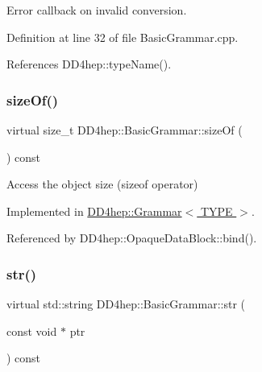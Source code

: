 Error callback on invalid conversion. 



Definition at line 32 of file Basic\+Grammar.\+cpp.



References D\+D4hep\+::type\+Name().

\hypertarget{class_d_d4hep_1_1_basic_grammar_a5e2ae03f6371357d3da7e082bbeabb0d}{}\label{class_d_d4hep_1_1_basic_grammar_a5e2ae03f6371357d3da7e082bbeabb0d} 
\subsubsection{\texorpdfstring{size\+Of()}{sizeOf()}}
{\footnotesize\ttfamily virtual size\+\_\+t D\+D4hep\+::\+Basic\+Grammar\+::size\+Of (\begin{DoxyParamCaption}{ }\end{DoxyParamCaption}) const\hspace{0.3cm}{\ttfamily [pure virtual]}}



Access the object size (sizeof operator) 



Implemented in \hyperlink{class_d_d4hep_1_1_grammar_a12daedd346b5eec5a95c0081918d7e0b}{D\+D4hep\+::\+Grammar$<$ T\+Y\+P\+E $>$}.



Referenced by D\+D4hep\+::\+Opaque\+Data\+Block\+::bind().

\hypertarget{class_d_d4hep_1_1_basic_grammar_a92fb01e1333540f417ef8151e774fd72}{}\label{class_d_d4hep_1_1_basic_grammar_a92fb01e1333540f417ef8151e774fd72} 
\subsubsection{\texorpdfstring{str()}{str()}}
{\footnotesize\ttfamily virtual std\+::string D\+D4hep\+::\+Basic\+Grammar\+::str (\begin{DoxyParamCaption}\item[{const void $\ast$}]{ptr }\end{DoxyParamCaption}) const\hspace{0.3cm}{\ttfamily [pure virtual]}}



